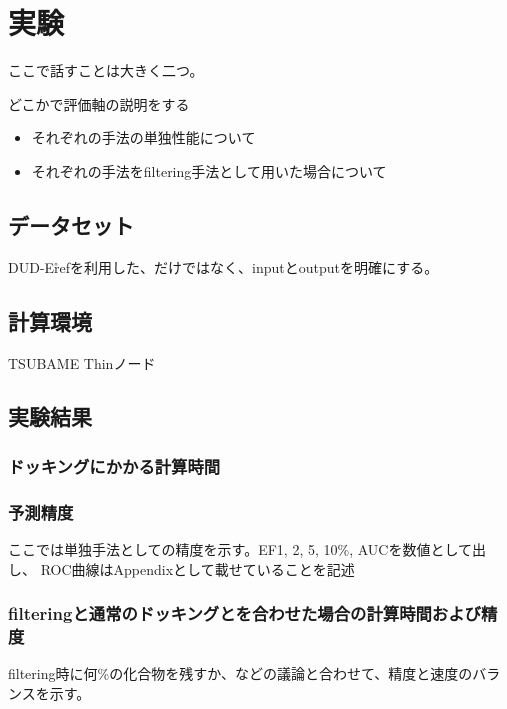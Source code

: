 \chapter{実験}
ここで話すことは大きく二つ。

どこかで評価軸の説明をする
\begin{itemize}
\item それぞれの手法の単独性能について
\item それぞれの手法をfiltering手法として用いた場合について
\end{itemize}
\section{データセット}
DUD-E\r{ref}を利用した、だけではなく、inputとoutputを明確にする。
\section{計算環境}
TSUBAME Thinノード
\section{実験結果}
\subsection{ドッキングにかかる計算時間}
\subsection{予測精度}
ここでは単独手法としての精度を示す。EF1, 2, 5, 10\%, AUCを数値として出し、
ROC曲線はAppendixとして載せていることを記述
\subsection{filteringと通常のドッキングとを合わせた場合の計算時間および精度}
filtering時に何\%の化合物を残すか、などの議論と合わせて、精度と速度のバランスを示す。
